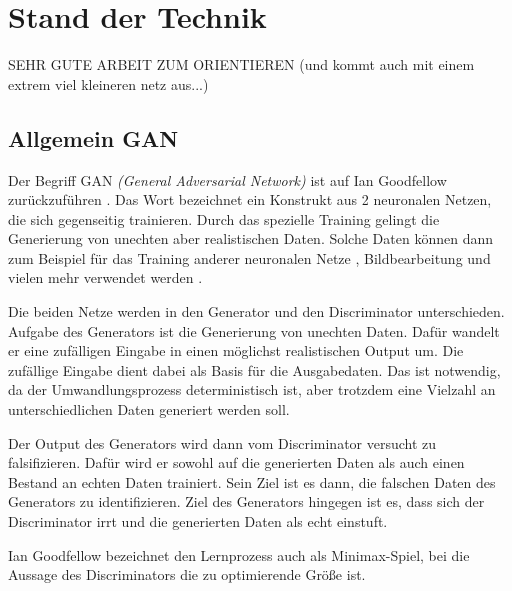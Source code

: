 
\chapter{Stand der Technik}

SEHR GUTE ARBEIT ZUM ORIENTIEREN (und kommt auch mit einem extrem viel kleineren netz aus...) \cite{gan-conditional}

\section{Allgemein GAN}


Der Begriff GAN \textit{(General Adversarial Network)} ist auf Ian Goodfellow zurückzuführen \cite{gan-original-paper}.
Das Wort bezeichnet ein Konstrukt aus 2 neuronalen Netzen, die sich gegenseitig trainieren.
Durch das spezielle Training gelingt die Generierung von unechten aber realistischen Daten.
Solche Daten können dann zum Beispiel für das Training anderer neuronalen Netze \cite{gan-application-augmenting-training-data}, Bildbearbeitung \cite{gan-application-upscaling, gan-application-blending} und vielen mehr verwendet werden \cite{gan-application-dna-optimizes-protein-functions, gan-application-audio-synthesis}.
\newline

Die beiden Netze werden in den Generator und den Discriminator unterschieden.
Aufgabe des Generators ist die Generierung von unechten Daten.
Dafür wandelt er eine zufälligen Eingabe in einen möglichst realistischen Output um.
Die zufällige Eingabe dient dabei als Basis für die Ausgabedaten.
Das ist notwendig, da der Umwandlungsprozess deterministisch ist, aber trotzdem eine Vielzahl an unterschiedlichen Daten generiert werden soll.

Der Output des Generators wird dann vom Discriminator versucht zu falsifizieren.
Dafür wird er sowohl auf die generierten Daten als auch einen Bestand an echten Daten trainiert.
Sein Ziel ist es dann, die falschen Daten des Generators zu identifizieren.
Ziel des Generators hingegen ist es, dass sich der Discriminator irrt und die generierten Daten als echt einstuft.

Ian Goodfellow bezeichnet den Lernprozess auch als Minimax-Spiel, bei die Aussage des Discriminators die zu optimierende Größe ist. \cite{gan-minimax}
\newline


